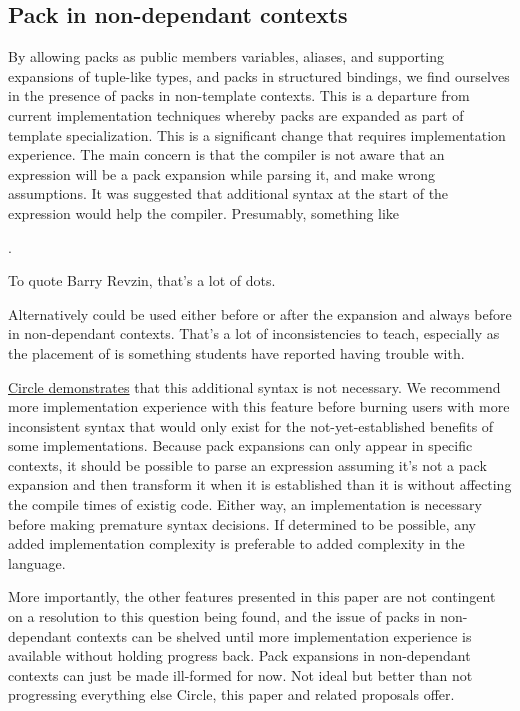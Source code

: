 \documentclass{wg21}
\begin{document}
\subsection{Pack in non-dependant contexts}

By allowing packs as public members variables, aliases, and supporting expansions of tuple-like types,
and packs in structured bindings, we find ourselves in the presence of packs in non-template contexts.
This is a departure from current implementation techniques whereby packs are expanded as part of template specialization.
This is a significant change that requires implementation experience.
The main concern is that the compiler is not aware that an expression will be a pack expansion while parsing it,
and make wrong assumptions.
It was suggested that additional syntax at the start of the expression would help the compiler. Presumably, something like

.

To quote Barry Revzin, that's a lot of dots.

Alternatively  could be used either before or after the expansion and always before in non-dependant contexts. That's a lot of inconsistencies to teach, especially as the placement of  is something students have reported having trouble with.

\href{https://godbolt.org/z/9ef4r69Wh}{Circle demonstrates} that this additional syntax is not necessary.
We recommend more implementation experience with this feature before burning users with more inconsistent syntax
that would only exist for the not-yet-established benefits of some implementations.
Because pack expansions can only appear in specific contexts, it should be possible to parse an expression
assuming it's not a pack expansion and then transform it when it is established than it is without affecting the compile times of existig code.
Either way, an implementation is necessary before making premature syntax decisions.
If determined to be possible, any added implementation complexity is preferable to added complexity in the language.

More importantly, the other features presented in this paper are not contingent on a resolution to this question being found, and the issue of packs in non-dependant contexts can be shelved until more implementation experience is available without holding progress back.
Pack expansions in non-dependant contexts can just be made ill-formed for now. Not ideal but better than not progressing everything else Circle, this paper and related proposals offer.
\end{document}

